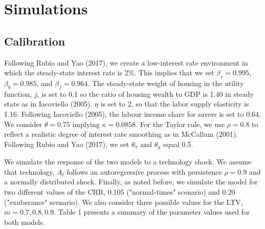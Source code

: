 \documentclass[final,3p,times,twocolumn]{elsarticle}
\begin{document}
\section{Simulations}
\label{S:2}


 \subsection{Calibration}
 
 
 
Following Rubio and Yao (2017), we create a low-interest rate environment in which the steady-state interest rate is 2\%. This implies that we set $\beta_s = 0.995$, $\beta_b = 0.985$, and $\beta_f = 0.964$. The steady-state weight of housing in the utility function, $j$, is set to 0.1 so the ratio of housing wealth to GDP is 1.40 in steady state as in Iacoviello (2005). $\eta$ is set to 2, so that the labor supply elasticity is 1.16. Following Iacoviello (2005), the labour income share for savers is set to 0.64. We consider $\theta = 0.75$ implying $\kappa = 0.0858$. For the Taylor rule, we use $\rho = 0.8$ to reflect a realistic degree of interest rate smoothing as in McCallum (2001). Following Rubio and Yao (2017), we set $\theta_\pi$ and $\theta_y$ equal 0.5.\par
 

We simulate the response of the two models to a technology shock. We assume that technology, $A_t$ follows an autoregressive process with persistence $\rho = 0.9$ and a normally distributed shock. Finally, as noted before, we simulate the model for two different values of the CRR, 0.105 ("normal-times" scenario) and 0.20 ("exuberance" scenario). We also consider three possible values for the LTV, $m = {0.7, 0.8, 0.9}$. Table 1 presents a summary of the parameter values used for both models.\par
 
\end{document}
